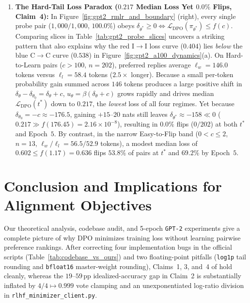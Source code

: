 \documentclass[11pt]{article}
\theoremstyle{plain}
\theoremstyle{definition}
\newcommand{\pithetastar}{\pi_{\theta^*}}
\newcommand{\LDPO}{\mathcal{L}_{\mathrm{DPO}}}
\newcommand{\CtoC}{\mathrm{C{\to}C}}
\newcommand{\ItoI}{\mathrm{I{\to}I}}
\begin{document}
\begin{enumerate}[leftmargin=1.8em,itemsep=2.5pt,topsep=2pt]
  \item \textbf{The Hard-Tail Loss Paradox ($0.217$ Median Loss Yet $0.0\%$ Flips, Claim~4):} In Figure~\ref{fig:gpt2_rmlr_and_boundary} (right), every single probe pair ($1{,}000 / 1{,}000$, $100.0\%$) obeys $\delta_{\theta^*} \ge 0 \iff \LDPO(\pithetastar) \le f(c)$. Comparing slices in Table~\ref{tab:gpt2_probe_slices} uncovers a striking pattern that also explains why the red $\ItoI$ loss curve ($0.404$) lies \emph{below} the blue $\CtoC$ curve ($0.538$) in Figure~\ref{fig:gpt2_a100_dynamics}(a). On Hard-to-Learn pairs ($c > 100$, $n = 202$), preferred replies average $\ell_w = 146.0$ tokens versus $\ell_l = 58.4$ tokens ($2.5\times$ longer). Because a small per-token probability gain summed across $146$ tokens produces a large positive shift in $\delta_\theta - \delta_{\theta_0} = \delta_\theta + c$, $u_\theta = \beta(\delta_\theta + c)$ grows rapidly and drives median $\LDPO(t^*)$ down to $0.217$, the \emph{lowest} loss of all four regimes. Yet because $\delta_{\theta_0} = -c \approx -176.5$, gaining $+15\text{--}20$ nats still leaves $\delta_{\theta^*} \approx -158 \ll 0$ ($0.217 \gg f(176.45) = 2.16 \times 10^{-8}$), resulting in $0.0\%$ flips ($0 / 202$) at both $t^*$ and Epoch~$5$. By contrast, in the narrow Easy-to-Flip band ($0 < c \le 2$, $n = 13$, $\ell_w / \ell_l = 56.5 / 52.9$ tokens), a modest median loss of $0.602 \le f(1.17) = 0.636$ flips $53.8\%$ of pairs at $t^*$ and $69.2\%$ by Epoch~$5$.
\end{enumerate}

\section{Conclusion and Implications for Alignment Objectives}
\label{sec:discussion}

Our theoretical analysis, codebase audit, and 5-epoch \texttt{GPT-2} experiments give a complete picture of why DPO minimizes training loss without learning pairwise preference rankings. After correcting four implementation bugs in the official scripts (Table~\ref{tab:codebase_vs_ours}) and two floating-point pitfalls (\texttt{log1p} tail rounding and \texttt{bfloat16} master-weight rounding), Claims~1, 3, and~4 of \citet{chen2024preference} hold cleanly, whereas the $19\text{--}59$\,pp idealized-accuracy gap in Claim~2 is substantially inflated by $4/4 \mapsto 0.999$ vote clamping and an unexponentiated log-ratio division in \texttt{rlhf\_minimizer\_client.py}.
\end{document}
